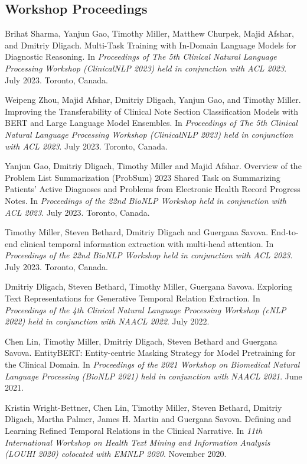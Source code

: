 \documentclass[letterpaper]{article}
\renewenvironment{itemize}{
  \begin{list}{}{
    \setlength{\leftmargin}{1.5em}
  }
}{
  \end{list}
}
\begin{document}
\subsection*{Workshop Proceedings}

\begin{itemize}
\item Brihat Sharma, Yanjun Gao, Timothy Miller, Matthew Churpek, Majid Afshar, and Dmitriy Dligach. Multi-Task Training with In-Domain Language Models for Diagnostic Reasoning. In \emph{Proceedings of The 5th Clinical Natural Language Processing Workshop (ClinicalNLP 2023) held in conjunction with ACL 2023}. July 2023. Toronto, Canada.
\item Weipeng Zhou, Majid Afshar, Dmitriy Dligach, Yanjun Gao, and Timothy Miller. Improving the Transferability of Clinical Note Section Classification Models with BERT and Large Language Model Ensembles. In \emph{Proceedings of The 5th Clinical Natural Language Processing Workshop (ClinicalNLP 2023) held in conjunction with ACL 2023}. July 2023. Toronto, Canada.
\item Yanjun Gao, Dmitriy Dligach, Timothy Miller and Majid Afshar. Overview of the Problem List Summarization (ProbSum) 2023 Shared Task on Summarizing Patients' Active Diagnoses and Problems from Electronic Health Record Progress Notes. In \emph{Proceedings of the 22nd BioNLP Workshop held in conjunction with ACL 2023}. July 2023. Toronto, Canada.
\item Timothy Miller, Steven Bethard, Dmitriy Dligach and Guergana Savova. End-to-end clinical temporal information extraction with multi-head attention. In \emph{Proceedings of the 22nd BioNLP Workshop held in conjunction with ACL 2023}. July 2023. Toronto, Canada.
\item Dmitriy Dligach, Steven Bethard, Timothy Miller, Guergana Savova. Exploring Text Representations for Generative Temporal Relation Extraction. In \emph{Proceedings of the 4th Clinical Natural Language Processing Workshop (cNLP 2022) held in conjunction with NAACL 2022}. July 2022.
\item Chen Lin, Timothy Miller, Dmitriy Dligach, Steven Bethard and Guergana Savova. EntityBERT: Entity-centric Masking Strategy for Model Pretraining for the Clinical Domain. In \emph{Proceedings of the 2021 Workshop on Biomedical Natural Language Processing (BioNLP 2021) held in conjunction with NAACL 2021}. June 2021.
\item Kristin Wright-Bettner, Chen Lin, Timothy Miller, Steven Bethard, Dmitriy Dligach, Martha Palmer, James H. Martin and Guergana Savova. Defining and Learning Refined Temporal Relations in the Clinical Narrative. In \emph{11th International Workshop on Health Text Mining and Information Analysis (LOUHI 2020) colocated with EMNLP 2020}. November 2020.

\end{itemize}
\end{document}
